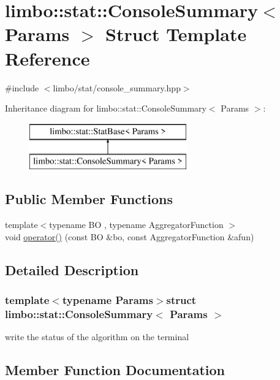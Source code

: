 \hypertarget{structlimbo_1_1stat_1_1_console_summary}{}\section{limbo\+:\+:stat\+:\+:Console\+Summary$<$ Params $>$ Struct Template Reference}
\label{structlimbo_1_1stat_1_1_console_summary}


{\ttfamily \#include $<$limbo/stat/console\+\_\+summary.\+hpp$>$}

Inheritance diagram for limbo\+:\+:stat\+:\+:Console\+Summary$<$ Params $>$\+:\begin{figure}[H]
\begin{center}
\leavevmode
\includegraphics[height=2.000000cm]{structlimbo_1_1stat_1_1_console_summary}
\end{center}
\end{figure}
\subsection*{Public Member Functions}
\begin{DoxyCompactItemize}
\item 
{\footnotesize template$<$typename B\+O , typename Aggregator\+Function $>$ }\\void \hyperlink{structlimbo_1_1stat_1_1_console_summary_a7c65e2f910881abe72e4bb181d357f4a}{operator()} (const B\+O \&bo, const Aggregator\+Function \&afun)
\end{DoxyCompactItemize}


\subsection{Detailed Description}
\subsubsection*{template$<$typename Params$>$struct limbo\+::stat\+::\+Console\+Summary$<$ Params $>$}

write the status of the algorithm on the terminal 

\subsection{Member Function Documentation}
\hypertarget{structlimbo_1_1stat_1_1_console_summary_a7c65e2f910881abe72e4bb181d357f4a}{}
